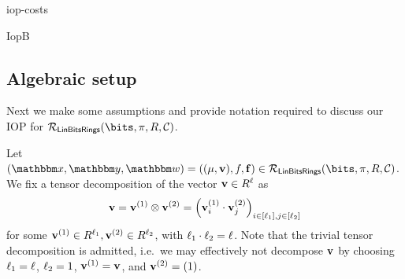 \begin{lncsappendix}{iop-costs}
\begin{lncsmove}{IopB}
\renewcommand{\modulemorphism}{\psi}
\renewcommand{\moduletwo}{R}



%
\renewcommand{\ringmorphism}{\pi}

\subsection{Algebraic setup}\label{s:interleaved_setting}


 Next we make some assumptions and provide notation required to discuss our IOP for $\LinBitsDual(\bits,\pi,R,\cC)$.

 Let $(\inp,\oracle,\wit)=((\mu,\vv), f, \bff) \in \LinBitsDual(\bits,\ringmorphism, R,\cC)$. We fix a tensor decomposition of the vector $\vv\in \moduletwo^\codedim$ as $$\mathbf{v} = \mathbf{v}^{(1)} \otimes \mathbf{v}^{(2)} = \left(\mathbf{v}_i^{(1)}\cdot \mathbf{v}_j^{(2)}\right)_{i\in [\ell_1], j\in [\ell_2]}$$ for some $\vv^{(1)}\in \moduletwo^{\codedim_1}, \vv^{(2)}\in \moduletwo^{\codedim_2}$, with $\ell_1 \cdot \ell_2=\ell$. Note that the trivial tensor decomposition is admitted, i.e.\ we may effectively not decompose $\mathbf{v}$ by choosing $\ell_1=\ell$, $\ell_2=1$, $\mathbf{v}^{(1)}=\mathbf{v}$, and $\mathbf{v}^{(2)} = (1)$.


\renewcommand{\modulemorphism}{\ringmorphism}


\end{lncsmove}
\end{lncsappendix}
